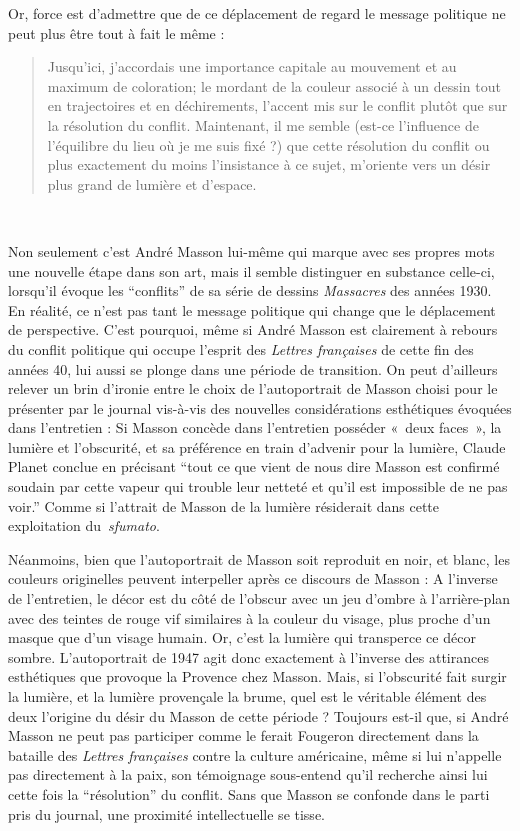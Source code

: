 
Or, force est d’admettre que de ce déplacement de regard le message politique ne peut plus être tout à fait le même : 
\begin{quote}
  Jusqu’ici, j’accordais une importance capitale au mouvement et au maximum de coloration; le mordant de la couleur associé à un dessin tout en trajectoires et en déchirements, l’accent mis sur le conflit plutôt que sur la résolution du conflit. Maintenant, il me semble (est-ce l’influence de l’équilibre du lieu où je me suis fixé ?) que cette résolution du conflit ou plus exactement du moins l’insistance à ce sujet, m’oriente vers un désir plus grand de lumière et d’espace.  
\end{quote}
 

	Non seulement c’est André Masson lui-même qui marque avec ses propres mots une nouvelle étape dans son art, mais il semble distinguer en substance celle-ci, lorsqu’il évoque les \enquote{conflits} de sa série de dessins \emph{Massacres} des années 1930. En réalité, ce n’est pas tant le message politique qui change que le déplacement de perspective. C’est pourquoi, même si André Masson est clairement à rebours du conflit politique qui occupe l’esprit des \emph{Lettres françaises} de cette fin des années 40, lui aussi se plonge dans une période de transition. On peut d’ailleurs relever un brin d’ironie entre le choix de l’autoportrait de Masson choisi pour le présenter par le journal vis-à-vis des nouvelles considérations esthétiques évoquées dans l’entretien : Si Masson concède dans l’entretien posséder « deux faces », la lumière et l’obscurité, et sa préférence en train d’advenir pour la lumière, Claude Planet conclue en précisant \enquote{tout ce que vient de nous dire Masson est confirmé soudain par cette vapeur qui trouble leur netteté et qu’il est impossible de ne pas voir.} Comme si l’attrait de Masson de la lumière résiderait dans cette exploitation du \emph{sfumato}. 


Néanmoins, bien que l’autoportrait de Masson soit reproduit en noir, et blanc, les couleurs originelles peuvent interpeller après ce discours de Masson : A l’inverse de l’entretien, le décor est du côté de l’obscur avec un jeu d’ombre à l’arrière-plan avec des teintes de rouge vif similaires à la couleur du visage, plus proche d’un masque que d’un visage humain. Or, c’est la lumière qui transperce ce décor sombre. L’autoportrait de 1947 agit donc exactement à l’inverse des attirances esthétiques que provoque la Provence chez Masson. Mais, si l’obscurité fait surgir la lumière, et la lumière provençale la brume, quel est le véritable élément des deux l’origine du désir du Masson de cette période ? Toujours est-il que, si André Masson ne peut pas participer comme le ferait Fougeron directement dans la bataille des \emph{Lettres françaises }contre la culture américaine, même si lui n’appelle pas directement à la paix, son témoignage sous-entend qu’il recherche ainsi lui cette fois la \enquote{résolution} du conflit. Sans que Masson se confonde dans le parti pris du journal, une proximité intellectuelle se tisse.  

